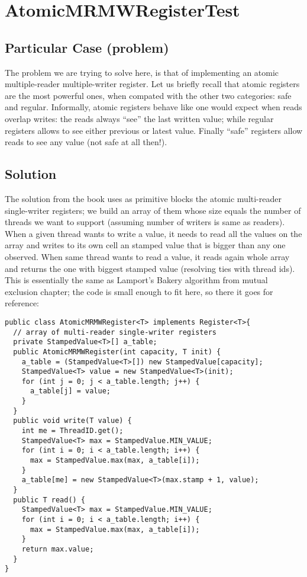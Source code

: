 \section{\textbf{AtomicMRMWRegisterTest}}

\subsection{Particular Case (problem)}
The problem we are trying to solve here, is that of implementing an
atomic multiple-reader multiple-writer register. Let us briefly recall
that atomic registers are the most powerful ones, when compated with the
other two categories: safe and regular. Informally, atomic registers
behave like one would expect when reads overlap writes: the reads
always ``see'' the last written value; while regular registers allows
to see either previous or latest value. Finally ``safe'' registers
allow reads to see any value (not safe at all then!). 

\subsection{Solution}
The solution from the book uses as primitive blocks the atomic
multi-reader single-writer registers; we build an array of them whose
size equals the number of threads we want to support (assuming number
of writers is same as readers). When a given thread  wants to
write a value, it needs to read all the values on the array and writes
to its own cell an stamped value that is bigger than any one
observed. When same thread wants to read a value, it reads again whole
array and returns the one with biggest stamped value (resolving ties
with thread ids). This is essentially the same as Lamport's Bakery
algorithm from mutual exclusion chapter; the code is small enough to
fit here, so there it goes for reference: \\

\begin{lstlisting}[style=numbers]
public class AtomicMRMWRegister<T> implements Register<T>{
  // array of multi-reader single-writer registers
  private StampedValue<T>[] a_table; 
  public AtomicMRMWRegister(int capacity, T init) {
    a_table = (StampedValue<T>[]) new StampedValue[capacity];
    StampedValue<T> value = new StampedValue<T>(init);
    for (int j = 0; j < a_table.length; j++) {
      a_table[j] = value;
    }
  }
  public void write(T value) {
    int me = ThreadID.get();
    StampedValue<T> max = StampedValue.MIN_VALUE;
    for (int i = 0; i < a_table.length; i++) {
      max = StampedValue.max(max, a_table[i]);
    }
    a_table[me] = new StampedValue<T>(max.stamp + 1, value);
  }
  public T read() {
    StampedValue<T> max = StampedValue.MIN_VALUE;
    for (int i = 0; i < a_table.length; i++) {
      max = StampedValue.max(max, a_table[i]);
    }
    return max.value;
  }
}
\end{lstlisting}

